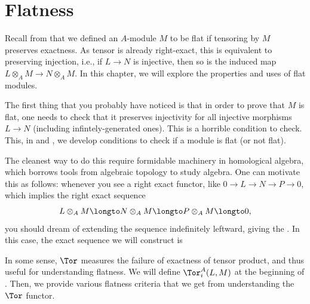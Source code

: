 \chapter{Flatness}
\label{chap:flatness}
Recall from  that we defined an $A$-module $M$ to be flat if tensoring by $M$ preserves exactness. As tensor is already right-exact, this is equivalent to preserving injection, i.e., if $L\to N$ is injective, then so is the induced map $L\otimes_A M\to N\otimes_A M$. In this chapter, we will explore the properties and uses of flat modules.

The first thing that you probably have noticed is that
in order to prove that $M$ is flat, one needs to check
that it preserves injectivity for all
injective morphisms $L\to N$ (including infintely-generated ones). 
This is a horrible condition to check.
This, in  and , we develop
conditions to check if a module is flat (or not flat).

The cleanest way to do this require formidable machinery
in homological algebra, which borrows tools from algebraic
topology to study algebra. One can motivate this as follows:
whenever you see a right exact functor, like
$0\to L\to N\to P\to 0$, which implies the right exact sequence
$$L\otimes_A M \longto N\otimes_A M \longto P\otimes_A M\longto 0,$$
you should dream of extending the sequence indefinitely leftward,
giving the .
In this case, the exact sequence we will construct is
    \begin{center}
\end{center}
In some sense, $\Tor$ measures the failure of exactness
of tensor product, and thus useful for
understanding flatness.
We will define $\Tor_i^A(L,M)$ at the beginning of 
.
Then, we provide various flatness criteria
that we get from understanding the $\Tor$ functor.

